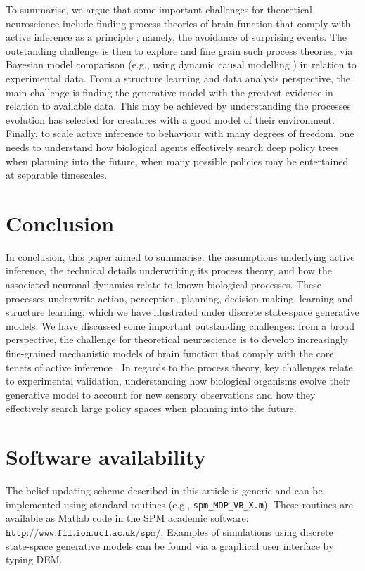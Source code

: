 \documentclass[review,12pt,authoryear]{elsarticle}
\begin{document}
To summarise, we argue that some important challenges for theoretical neuroscience include finding process theories of brain function that comply with active inference as a principle \citep{parrMarkovBlanketsInformation2020,fristonFreeEnergyPrinciple2019}; namely, the avoidance of surprising events. The outstanding challenge is then to explore and fine grain such process theories, via Bayesian model comparison (e.g., using dynamic causal modelling \citep{fristonDynamicCausalModelling2003,fristonHistoryFutureBayesian2012}) in relation to experimental data. From a structure learning and data analysis perspective, the main challenge is finding the generative model with the greatest evidence in relation to available data. This may be achieved by understanding the processes evolution has selected for creatures with a good model of their environment. Finally, to scale active inference to behaviour with many degrees of freedom, one needs to understand how biological agents effectively search deep policy trees when planning into the future, when many possible policies may be entertained at separable timescales.

\section{Conclusion}

In conclusion, this paper aimed to summarise: the assumptions underlying active inference, the technical details underwriting its process theory, and how the associated neuronal dynamics relate to known biological processes. These processes underwrite action, perception, planning, decision-making, learning and structure learning; which we have illustrated under discrete state-space generative models. We have discussed some important outstanding challenges: from a broad perspective, the challenge for theoretical neuroscience is to develop increasingly fine-grained mechanistic models of brain function that comply with the core tenets of active inference \citep{parrMarkovBlanketsInformation2020,fristonFreeEnergyPrinciple2019}. In regards to the process theory, key challenges relate to experimental validation, understanding how biological organisms evolve their generative model to account for new sensory observations and how they effectively search large policy spaces when planning into the future.

\section*{Software availability}
The belief updating scheme described in this article is generic and can be implemented using standard routines (e.g., \texttt{spm\_MDP\_VB\_X.m}). These routines are available as Matlab code in the SPM academic software: $\texttt{http://www.fil.ion.ucl.ac.uk/spm/}$. Examples of simulations using discrete state-space generative models can be found via a graphical user interface by typing DEM.
\end{document}
